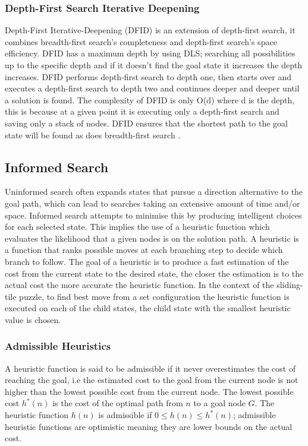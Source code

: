 \documentclass[final]{cmpreport}
\begin{document}
\subsubsection{Depth-First Search Iterative Deepening}
Depth-First Iterative-Deepening (DFID) is an extension of depth-first search, it combines breadth-first search's completeness and depth-first search's space efficiency. DFID has a maximum depth by using DLS; searching all possibilities up to the specific depth and if it doesn't find the goal state it increases the depth increases. DFID performs depth-first search to depth one, then starts over and executes a depth-first search to depth two and continues deeper and deeper until a solution is found. The complexity of DFID is only O(d) where d is the depth, this is because at a given point it is executing only a depth-first search and saving only a stack of nodes. DFID ensures that the shortest path to the goal state will be found as does breadth-first search \citep{DBLP:conf/otm/MeissnerB11}.








\subsection{Informed Search}
Uninformed search often expands states that pursue a direction alternative to the goal path, which can lead to searches taking an extensive amount of time and/or space. Informed search attempts to minimise this by producing intelligent choices for each selected state. This implies the use of a heuristic function which evaluates the likelihood that a given nodes is on the solution path. A heuristic is a function that ranks possible moves at each branching step to decide which branch to follow. The goal of a heuristic is to produce a fast estimation of the cost from the current state to the desired state, the closer the estimation is to the actual cost the more accurate the heuristic function. In the context of the sliding-tile puzzle, to find best move from a set configuration the heuristic function is executed on each of the child states, the child state with the smallest heuristic value is chosen.
 


\subsubsection{Admissible Heuristics}
A heuristic function is said to be admissible if it never overestimates the cost of reaching the goal, i.e the estimated cost to the goal from the current node is not higher than the lowest possible cost from the current node. The lowest possible cost $h^*(n)$ is the cost of the optimal path from $n$ to a goal node $G$. The heuristic function $h(n)$ is admissible if $0 \leq h(n) \leq h^*(n)$; admissible heuristic functions are optimistic meaning they are lower bounds on the actual cost.
\end{document}
